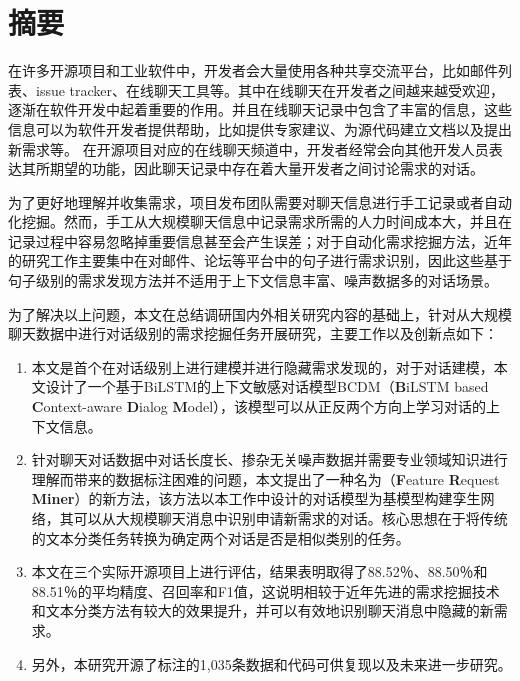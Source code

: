 \maketitle%
\MAKETITLE%
\makedeclaration%
\intobmk\chapter*{摘\quad 要}%
\setcounter{page}{1}%

在许多开源项目和工业软件中，开发者会大量使用各种共享交流平台，比如邮件列表、issue tracker、在线聊天工具等。其中在线聊天在开发者之间越来越受欢迎，逐渐在软件开发中起着重要的作用。并且在线聊天记录中包含了丰富的信息，这些信息可以为软件开发者提供帮助，比如提供专家建议、为源代码建立文档以及提出新需求等。
在开源项目对应的在线聊天频道中，开发者经常会向其他开发人员表达其所期望的功能，因此聊天记录中存在着大量开发者之间讨论需求的对话。

为了更好地理解并收集需求，项目发布团队需要对聊天信息进行手工记录或者自动化挖掘。然而，手工从大规模聊天信息中记录需求所需的人力时间成本大，并且在记录过程中容易忽略掉重要信息甚至会产生误差；对于自动化需求挖掘方法，近年的研究工作主要集中在对邮件、论坛等平台中的句子进行需求识别，因此这些基于句子级别的需求发现方法并不适用于上下文信息丰富、噪声数据多的对话场景。

为了解决以上问题，本文在总结调研国内外相关研究内容的基础上，针对从大规模聊天数据中进行对话级别的需求挖掘任务开展研究，主要工作以及创新点如下：
\setlist[enumerate]{}%
\begin{enumerate}[nosep]
    \item 本文是首个在对话级别上进行建模并进行隐藏需求发现的，对于对话建模，本文设计了一个基于BiLSTM的上下文敏感对话模型BCDM（\textbf{B}iLSTM based \textbf{C}ontext-aware \textbf{D}ialog \textbf{M}odel），该模型可以从正反两个方向上学习对话的上下文信息。
    \item 针对聊天对话数据中对话长度长、掺杂无关噪声数据并需要专业领域知识进行理解而带来的数据标注困难的问题，本文提出了一种名为{\tool}（\textbf{F}eature \textbf{R}equest \textbf{Miner}）的新方法，该方法以本工作中设计的对话模型{\dm}为基模型构建孪生网络，其可以从大规模聊天消息中识别申请新需求的对话。{\tool}核心思想在于将传统的文本分类任务转换为确定两个对话是否是相似类别的任务。
    \item 本文在三个实际开源项目上进行评估，结果表明{\tool}取得了88.52％、88.50％和88.51％的平均精度、召回率和F1值，这说明{\tool}相较于近年先进的需求挖掘技术和文本分类方法有较大的效果提升，并可以有效地识别聊天消息中隐藏的新需求。\item 另外，本研究开源了标注的1,035条数据和代码可供复现以及未来进一步研究。
\end{enumerate}

